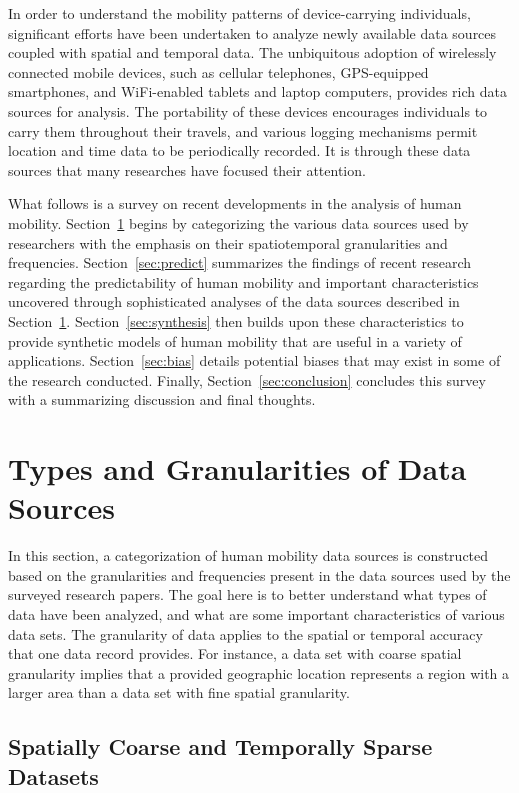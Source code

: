 \documentclass[journal]{IEEEtran}
\begin{document}
In order to understand the mobility patterns of device-carrying individuals, significant efforts have been undertaken to analyze newly available data sources coupled with spatial and temporal data. The unbiquitous adoption of wirelessly connected mobile devices, such as cellular telephones, GPS-equipped smartphones, and WiFi-enabled tablets and laptop computers, provides rich data sources for analysis. The portability of these devices encourages individuals to carry them throughout their travels, and various logging mechanisms permit location and time data to be periodically recorded. It is through these data sources that many researches have focused their attention.

What follows is a survey on recent developments in the analysis of human mobility. Section~\ref{sec:sources} begins by categorizing the various data sources used by researchers with the emphasis on their spatiotemporal granularities and frequencies. Section~\ref{sec:predict} summarizes the findings of recent research regarding the predictability of human mobility and important characteristics uncovered through sophisticated analyses of the data sources described in Section~\ref{sec:sources}. Section~\ref{sec:synthesis} then builds upon these characteristics to provide synthetic models of human mobility that are useful in a variety of applications. Section~\ref{sec:bias} details potential biases that may exist in some of the research conducted. Finally, Section~\ref{sec:conclusion} concludes this survey with a summarizing discussion and final thoughts.

\section{Types and Granularities of Data Sources} \label{sec:sources}

In this section, a categorization of human mobility data sources is constructed based on the granularities and frequencies present in the data sources used by the surveyed research papers. The goal here is to better understand what types of data have been analyzed, and what are some important characteristics of various data sets. The granularity of data applies to the spatial or temporal accuracy that one data record provides. For instance, a data set with coarse spatial granularity implies that a provided geographic location represents a region with a larger area than a data set with fine spatial granularity.

\subsection{Spatially Coarse and Temporally Sparse Datasets}
\end{document}
